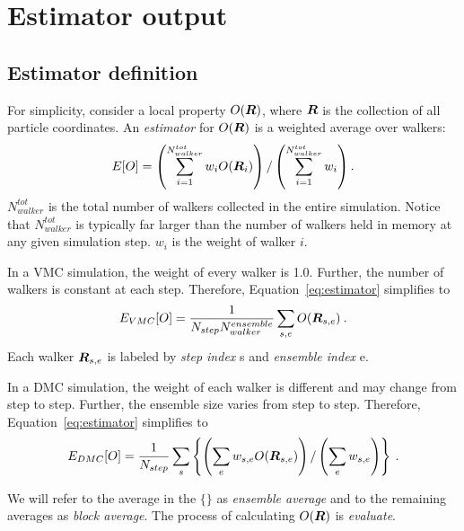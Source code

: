 \section{Estimator output}
\subsection{Estimator definition}
For simplicity, consider a local property $O(\boldsymbol{R})$, where $\boldsymbol{R}$ is the collection of all particle coordinates. An \textit{estimator} for $O(\boldsymbol{R}) $ is a weighted average over walkers:
\begin{align}
E[O] = \left(\sum\limits_{i=1}^{N^{tot}_{walker}} w_i O(\boldsymbol{R}_i) \right) / \left( \sum \limits_{i=1}^{N^{tot}_{walker}} w_i \right). \label{eq:estimator}
\end{align}
$N^{tot}_{walker}$ is the total number of walkers collected in the entire simulation. Notice that $N^{tot}_{walker}$ is typically far larger than the number of walkers held in memory at any given simulation step. $w_i$ is the weight of walker $i$.

In a VMC simulation, the weight of every walker is 1.0. Further, the number of walkers is constant at each step. Therefore, Equation~\ref{eq:estimator} simplifies to
\begin{align}
E_{VMC}[O] = \frac{1}{N_{step}N_{walker}^{ensemble}} \sum_{s,e} O(\boldsymbol{R}_{s,e})\:.
\end{align}
Each walker $\boldsymbol{R}_{s,e}$ is labeled by \textit{step index} s and \textit{ensemble index} e.

In a DMC simulation, the weight of each walker is different and may change from step to step. Further, the ensemble size varies from step to step. Therefore, Equation~\ref{eq:estimator} simplifies to
\begin{align}
E_{DMC}[O] = \frac{1}{N_{step}} \sum_{s} \left\{ \left(\sum_e w_{s,e} O(\boldsymbol{R}_{s,e})  \right) / \left( \sum \limits_{e} w_{s,e} \right)  \right\}\:.
\end{align}

We will refer to the average in the $\{\}$ as \textit{ensemble average} and to the remaining averages as \textit{block average}. The process of calculating $O(\boldsymbol{R})$ is \textit{evaluate}.

